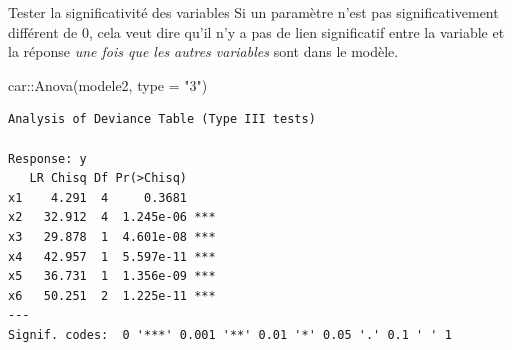 \documentclass[
  ignorenonframetext,
]{beamer}
\newenvironment{Shaded}{\begin{snugshade}}{\end{snugshade}}
\newcommand{\AttributeTok}[1]{\textcolor[rgb]{0.40,0.45,0.13}{#1}}
\newcommand{\FunctionTok}[1]{\textcolor[rgb]{0.28,0.35,0.67}{#1}}
\newcommand{\NormalTok}[1]{\textcolor[rgb]{0.00,0.23,0.31}{#1}}
\newcommand{\SpecialCharTok}[1]{\textcolor[rgb]{0.37,0.37,0.37}{#1}}
\newcommand{\StringTok}[1]{\textcolor[rgb]{0.13,0.47,0.30}{#1}}
\begin{document}
\begin{frame}[fragile]{Tester la significativité des variables}
\protect\hypertarget{tester-la-significativituxe9-des-variables}{}
Si un paramètre n'est pas significativement différent de 0, cela veut
dire qu'il n'y a pas de lien significatif entre la variable et la
réponse \emph{une fois que les autres variables} sont dans le modèle.

\footnotesize

\begin{Shaded}
\begin{Highlighting}[numbers=left,,]
\NormalTok{car}\SpecialCharTok{::}\FunctionTok{Anova}\NormalTok{(modele2, }\AttributeTok{type =} \StringTok{"3"}\NormalTok{)}
\end{Highlighting}
\end{Shaded}

\begin{verbatim}
Analysis of Deviance Table (Type III tests)

Response: y
   LR Chisq Df Pr(>Chisq)    
x1    4.291  4     0.3681    
x2   32.912  4  1.245e-06 ***
x3   29.878  1  4.601e-08 ***
x4   42.957  1  5.597e-11 ***
x5   36.731  1  1.356e-09 ***
x6   50.251  2  1.225e-11 ***
---
Signif. codes:  0 '***' 0.001 '**' 0.01 '*' 0.05 '.' 0.1 ' ' 1
\end{verbatim}

\normalsize
\end{frame}
\end{document}
